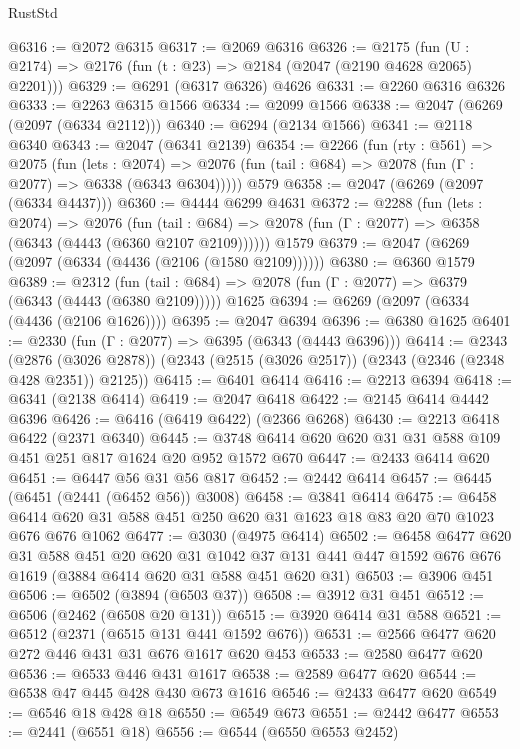 \begin{lexlean}{RustStd}
\begin{coremodule}
@6316 := @2072 @6315
@6317 := @2069 @6316
@6326 := @2175 (fun (U : @2174) => @2176 (fun (t : @23) => @2184 (@2047 (@2190 @4628 @2065) @2201)))
@6329 := @6291 (@6317 @6326) @4626
@6331 := @2260 @6316 @6326
@6333 := @2263 @6315 @1566
@6334 := @2099 @1566
@6338 := @2047 (@6269 (@2097 (@6334 @2112)))
@6340 := @6294 (@2134 @1566)
@6341 := @2118 @6340
@6343 := @2047 (@6341 @2139)
@6354 := @2266
    (fun (rty : @561) =>
    @2075
      (fun (lets : @2074) =>
      @2076 (fun (tail : @684) => @2078 (fun (Γ : @2077) => @6338 (@6343 @6304)))))
    @579
@6358 := @2047 (@6269 (@2097 (@6334 @4437)))
@6360 := @4444 @6299 @4631
@6372 := @2288
    (fun (lets : @2074) =>
    @2076
      (fun (tail : @684) => @2078 (fun (Γ : @2077) => @6358 (@6343 (@4443 (@6360 @2107 @2109))))))
    @1579
@6379 := @2047 (@6269 (@2097 (@6334 (@4436 (@2106 (@1580 @2109))))))
@6380 := @6360 @1579
@6389 := @2312
    (fun (tail : @684) => @2078 (fun (Γ : @2077) => @6379 (@6343 (@4443 (@6380 @2109)))))
    @1625
@6394 := @6269 (@2097 (@6334 (@4436 (@2106 @1626))))
@6395 := @2047 @6394
@6396 := @6380 @1625
@6401 := @2330 (fun (Γ : @2077) => @6395 (@6343 (@4443 @6396)))
@6414 := @2343
    (@2876 (@3026 @2878))
    (@2343 (@2515 (@3026 @2517)) (@2343 (@2346 (@2348 @428 @2351)) @2125))
@6415 := @6401 @6414
@6416 := @2213 @6394
@6418 := @6341 (@2138 @6414)
@6419 := @2047 @6418
@6422 := @2145 @6414 @4442 @6396
@6426 := @6416 (@6419 @6422) (@2366 @6268)
@6430 := @2213 @6418 @6422 (@2371 @6340)
@6445 := @3748 @6414 @620 @620 @31 @31 @588 @109 @451 @251 @817 @1624 @20 @952 @1572 @670
@6447 := @2433 @6414 @620
@6451 := @6447 @56 @31 @56 @817
@6452 := @2442 @6414
@6457 := @6445 (@6451 (@2441 (@6452 @56)) @3008)
@6458 := @3841 @6414
@6475 := @6458 @6414 @620 @31 @588 @451 @250 @620 @31 @1623 @18 @83 @20 @70 @1023 @676 @676 @1062
@6477 := @3030 (@4975 @6414)
@6502 := @6458
    @6477
    @620
    @31
    @588
    @451
    @20
    @620
    @31
    @1042
    @37
    @131
    @441
    @447
    @1592
    @676
    @676
    @1619
    (@3884 @6414 @620 @31 @588 @451 @620 @31)
@6503 := @3906 @451
@6506 := @6502 (@3894 (@6503 @37))
@6508 := @3912 @31 @451
@6512 := @6506 (@2462 (@6508 @20 @131))
@6515 := @3920 @6414 @31 @588
@6521 := @6512 (@2371 (@6515 @131 @441 @1592 @676))
@6531 := @2566 @6477 @620 @272 @446 @431 @31 @676 @1617 @620 @453
@6533 := @2580 @6477 @620
@6536 := @6533 @446 @431 @1617
@6538 := @2589 @6477 @620
@6544 := @6538 @47 @445 @428 @430 @673 @1616
@6546 := @2433 @6477 @620
@6549 := @6546 @18 @428 @18
@6550 := @6549 @673
@6551 := @2442 @6477
@6553 := @2441 (@6551 @18)
@6556 := @6544 (@6550 @6553 @2452)

\end{coremodule}
\end{lexlean}
